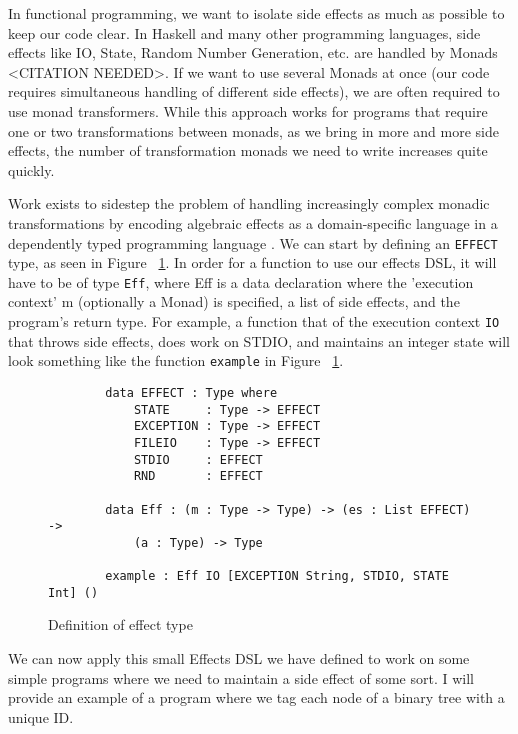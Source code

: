 In functional programming, we want to isolate side effects as much as possible
to keep our code clear. In Haskell and many other programming languages, side
effects like IO, State, Random Number Generation, etc. are handled by Monads
<CITATION NEEDED>. If we want to use several Monads at once (our code requires
simultaneous handling of different side effects), we are often required to use
monad transformers. While this approach works for programs that require one or
two transformations between monads, as we bring in more and more side effects,
the number of transformation monads we need to write increases quite quickly. 

Work exists to sidestep the problem of handling increasingly complex monadic
transformations by encoding algebraic effects as a domain-specific language in a
dependently typed programming language \cite{algebraic}. We can start by
defining an \texttt{EFFECT} type, as seen in Figure ~\ref{effects_def}. In order
for a function to use our effects DSL, it will have to be of type \texttt{Eff},
where Eff is a data declaration where the 'execution context' m (optionally a
Monad) is specified, a list of side effects, and the program's return type. For
example, a function that of the execution context \texttt{IO} that throws side
effects, does work on STDIO, and maintains an integer state will look something
like the function \texttt{example} in Figure ~\ref{effects_def}. 

\begin{figure}[h]
    \caption{Definition of effect type}
    \label{effects_def}
    \begin{lstlisting}
        data EFFECT : Type where
            STATE     : Type -> EFFECT
            EXCEPTION : Type -> EFFECT
            FILEIO    : Type -> EFFECT
            STDIO     : EFFECT
            RND       : EFFECT
        
        data Eff : (m : Type -> Type) -> (es : List EFFECT) -> 
            (a : Type) -> Type
    
        example : Eff IO [EXCEPTION String, STDIO, STATE Int] ()
    \end{lstlisting}
\end{figure}

We can now apply this small Effects DSL we have defined to work on some simple
programs where we need to maintain a side effect of some sort. I will provide an
example of a program where we tag each node of a binary tree with a unique ID. 

